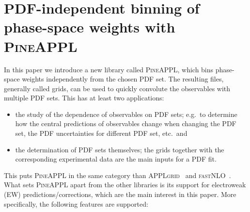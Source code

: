 \section{PDF-independent binning of phase-space weights with \texorpdfstring{\textsc{PineAPPL}}{PineAPPL}}
\label{sec:pineappl}

In this paper we introduce a new library called \textsc{PineAPPL}, which bins phase-space weights independently from the chosen PDF set.
The resulting files, generally called grids, can be used to quickly convolute the observables with multiple PDF sets.
This has at least two applications:
\begin{itemize}
\item the study of the dependence of observables on PDF sets; e.g.\ to determine how the central predictions of observables change when changing the PDF set, the PDF uncertainties for different PDF set, etc.\ and
\item the determination of PDF sets themselves; the grids together with the corresponding experimental data are the main inputs for a PDF fit.
\end{itemize}
This puts \textsc{PineAPPL} in the same category than \textsc{APPLgrid}~\cite{Carli:2010rw} and \textsc{fastNLO}~\cite{Kluge:2006xs,Wobisch:2011ij,Britzger:2012bs}.
What sets \textsc{PineAPPL} apart from the other libraries is its support for electroweak (EW) predictions/corrections, which are the main interest in this paper.
More specifically, the following features are supported:
